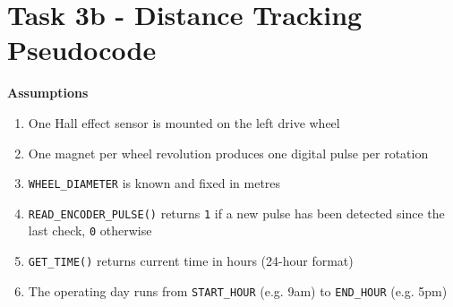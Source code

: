 \documentclass[11 pt , a 4 paper ]{article}
\theoremstyle{definition}
\begin{document}
  \section*{Task 3b - Distance Tracking Pseudocode}
  \textbf{Assumptions}
  \begin{enumerate}
    \item One Hall effect sensor is mounted on the left drive wheel
    \item One magnet per wheel revolution produces one digital pulse per rotation
    \item \texttt{WHEEL\_DIAMETER} is known and fixed in metres
    \item \texttt{READ\_ENCODER\_PULSE()} returns \texttt{1} if a new pulse has been detected since the last check, \texttt{0} otherwise
    \item \texttt{GET\_TIME()} returns current time in hours (24-hour format)
    \item The operating day runs from \texttt{START\_HOUR} (e.g. 9am) to \texttt{END\_HOUR} (e.g. 5pm)
  \end{enumerate}
\end{document}
